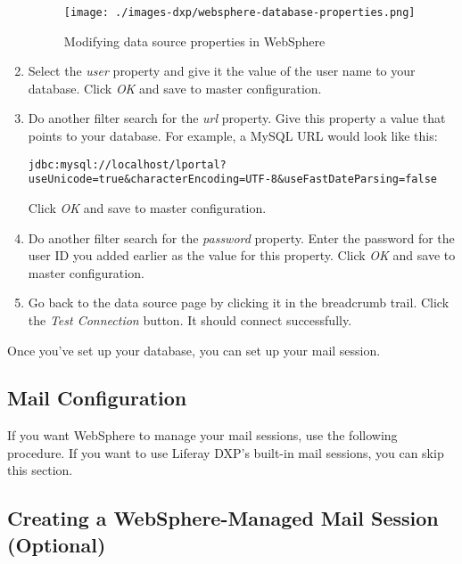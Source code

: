\begin{enumerate}
  \begin{figure}
  \centering
  \texttt{[image: ./images-dxp/websphere-database-properties.png]}
  \caption{Modifying data source properties in WebSphere}
  \end{figure}
\item
  Select the \emph{user} property and give it the value of the user name
  to your database. Click \emph{OK} and save to master configuration.
\item
  Do another filter search for the \emph{url} property. Give this
  property a value that points to your database. For example, a MySQL
  URL would look like this:

\begin{verbatim}
jdbc:mysql://localhost/lportal?useUnicode=true&characterEncoding=UTF-8&useFastDateParsing=false
\end{verbatim}

  Click \emph{OK} and save to master configuration.
\item
  Do another filter search for the \emph{password} property. Enter the
  password for the user ID you added earlier as the value for this
  property. Click \emph{OK} and save to master configuration.
\item
  Go back to the data source page by clicking it in the breadcrumb
  trail. Click the \emph{Test Connection} button. It should connect
  successfully.
\end{enumerate}

Once you've set up your database, you can set up your mail session.

\subsection{Mail Configuration}\label{mail-configuration-4}

If you want WebSphere to manage your mail sessions, use the following
procedure. If you want to use Liferay DXP's built-in mail sessions, you
can skip this section.

\subsection{Creating a WebSphere-Managed Mail Session
(Optional)}\label{creating-a-websphere-managed-mail-session-optional}

